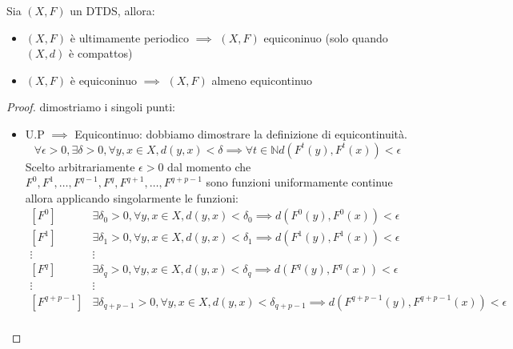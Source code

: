 \begin{teorema}
    Sia $(X,F)$ un DTDS, allora:
    \begin{itemize}
        \item $(X,F)$ è ultimamente periodico $\implies$ $(X,F)$ equiconinuo (solo quando $(X,d)$ è compattos)
        \item $(X,F)$ è equiconinuo $\implies$ $(X,F)$ almeno equicontinuo
    \end{itemize}
    \begin{proof}
        dimostriamo i singoli punti:
        \begin{itemize}
            \item U.P $\implies$ Equicontinuo: dobbiamo dimostrare la definizione
                  di equicontinuità.
                  $$\forall \epsilon > 0,\exists \delta > 0, \forall y, x\in X, d(y,x) < \delta \implies \forall t\in \mathbb{N} d(F^t(y),F^t(x))< \epsilon$$
                  Scelto arbitrariamente $\epsilon>0$ dal momento che $F^0, F^{1}, \dots, F^{q-1},F^{q},F^{q+1},\dots,F^{q+p-1}$
                  sono funzioni uniformamente continue allora applicando singolarmente le funzioni:
                  \begin{equation*}
                      \begin{array}{cl}
                          \left[F^0\right]       & \exists \delta_0 > 0, \forall y, x\in X, d(y,x) < \delta_0 \implies d(F^0(y),F^0(x))< \epsilon                         \\
                          \left[F^1\right]       & \exists \delta_1 > 0, \forall y, x\in X, d(y,x) < \delta_1 \implies d(F^1(y),F^1(x))< \epsilon                         \\
                          \vdots                 & \vdots                                                                                                                         \\
                          \left[F^q\right]       & \exists \delta_q > 0, \forall y, x\in X, d(y,x) < \delta_q \implies d(F^q(y),F^q(x))< \epsilon                         \\
                          \vdots                 & \vdots                                                                                                                         \\
                          \left[F^{q+p-1}\right] & \exists \delta_{q+p-1} > 0, \forall y, x\in X, d(y,x) < \delta_{q+p-1} \implies d(F^{q+p-1}(y),F^{q+p-1}(x))< \epsilon \\

\end{array}
\end{equation*}
\end{itemize}
\end{proof}
\end{teorema}
